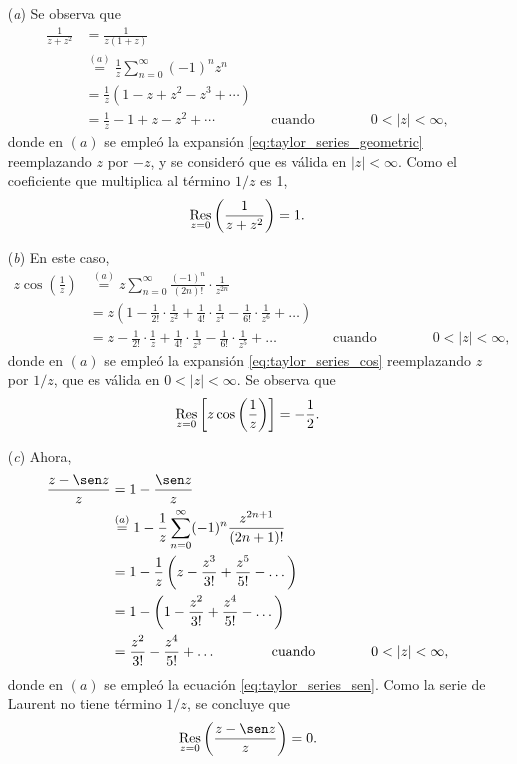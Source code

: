 \documentclass[a4paper]{report}
\def\Res{\qopname\relax m{Res}}
\begin{document}
\begin{enumerate}
 \item[(\textit{a})] Se observa que
 \begin{align*}
  \frac{1}{z+z^2}&=\frac{1}{z(1+z)}\\
   &\overset{(a)}{=}\frac{1}{z}\sum_{n=0}^\infty(-1)^nz^n\\
   &=\frac{1}{z}(1-z+z^2-z^3+\cdots)\\
   &=\frac{1}{z}-1+z-z^2+\cdots
   \qquad\qquad\textrm{cuando}\qquad\qquad
   0<|z|<\infty,
 \end{align*}
 donde en \((a)\) se empleó la expansión \ref{eq:taylor_series_geometric} reemplazando \(z\) por \(-z\), y se consideró que es válida en \(|z|<\infty\). Como el coeficiente que multiplica al término \(1/z\) es 1,
 \[
  \Res_{z=0}\left(\frac{1}{z+z^2}\right)=1.
 \]
 \item[(\textit{b})] En este caso,
 \begin{align*}
  z\cos\left(\frac{1}{z}\right)&\overset{(a)}{=}z\sum_{n=0}^\infty\frac{(-1)^n}{(2n)!}\cdot\frac{1}{z^{2n}}\\
   &=z\left(1-\frac{1}{2!}\cdot\frac{1}{z^2}+\frac{1}{4!}\cdot\frac{1}{z^4}-\frac{1}{6!}\cdot\frac{1}{z^6}+\dots\right)\\
   &=z-\frac{1}{2!}\cdot\frac{1}{z}+\frac{1}{4!}\cdot\frac{1}{z^3}-\frac{1}{6!}\cdot\frac{1}{z^5}+\dots
   \qquad\qquad\textrm{cuando}\qquad\qquad
   0<|z|<\infty,
 \end{align*}
  donde en \((a)\) se empleó la expansión \ref{eq:taylor_series_cos} reemplazando \(z\) por \(1/z\), que es válida en \(0<|z|<\infty\). Se observa que
 \[
  \Res_{z=0}\left[z\cos\left(\frac{1}{z}\right)\right]=-\frac{1}{2}.
 \]
 \item[(\textit{c})] Ahora,
 \begin{align*}
  \frac{z-\sen z}{z}&=1-\frac{\sen z}{z}\\
   &\overset{(a)}{=}1-\frac{1}{z}\sum_{n=0}^\infty(-1)^n\frac{z^{2n+1}}{(2n+1)!}\\
   &=1-\frac{1}{z}\left(z-\frac{z^3}{3!}+\frac{z^5}{5!}-\dots\right)\\
   &=1-\left(1-\frac{z^2}{3!}+\frac{z^4}{5!}-\dots\right)\\
   &=\frac{z^2}{3!}-\frac{z^4}{5!}+\dots
   \qquad\qquad\textrm{cuando}\qquad\qquad
   0<|z|<\infty,
 \end{align*}
 donde en \((a)\) se empleó la ecuación \ref{eq:taylor_series_sen}. Como la serie de Laurent no tiene término \(1/z\), se concluye que
 \[
  \Res_{z=0}\left(\frac{z-\sen z}{z}\right)=0.
\]
\end{enumerate}
\end{document}
